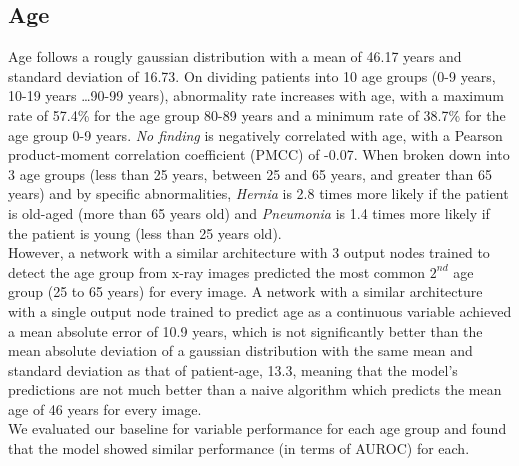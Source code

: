 \documentclass[12pt,oneside,a4paper]{report}
\begin{document}
\subsection{Age}
Age follows a rougly gaussian distribution with a mean of 46.17 years and standard deviation of 16.73. On dividing patients into 10 age groups (0-9 years, 10-19 years \dots 90-99 years), abnormality rate increases with age, with a maximum rate of 57.4\% for the age group 80-89 years and a minimum rate of 38.7\% for the age group 0-9 years. \emph{No finding} is negatively correlated with age, with a Pearson product-moment correlation coefficient (PMCC) of -0.07. When broken down into 3 age groups (less than 25 years, between 25 and 65 years, and greater than 65 years) and by specific abnormalities, \emph{Hernia} is 2.8 times more likely if the patient is old-aged (more than 65 years old) and \emph{Pneumonia} is 1.4 times more likely if the patient is young (less than 25 years old).\\

However, a network with a similar architecture with 3 output nodes trained to detect the age group from x-ray images predicted the most common $2^{nd}$ age group (25 to 65 years) for every image. A network with a similar architecture with a single output node trained to predict age as a continuous variable achieved a mean absolute error of 10.9 years, which is not significantly better than the mean absolute deviation of a gaussian distribution with the same mean and standard deviation as that of patient-age, 13.3, meaning that the model's predictions are not much better than a naive algorithm which predicts the mean age of 46 years for every image.\\

We evaluated our baseline for variable performance for each age group and found that the model showed similar performance (in terms of AUROC) for each.
\end{document}
